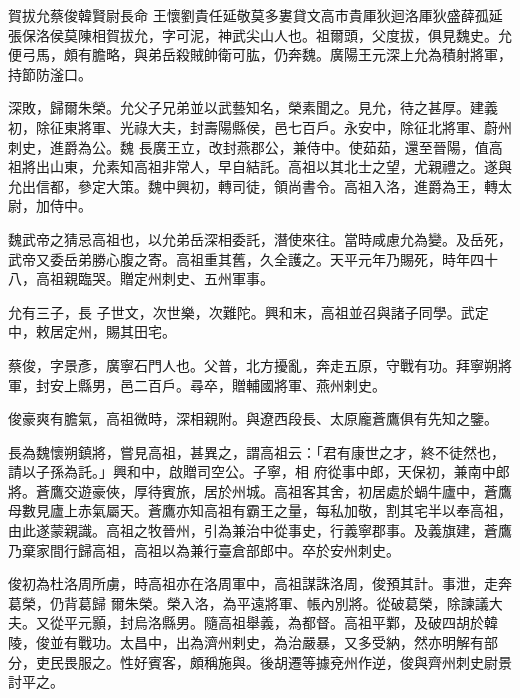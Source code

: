 
\begin{pinyinscope}

 賀拔允蔡俊韓賢尉長命
 王懷劉貴任延敬莫多婁貸文高市貴厙狄迴洛厙狄盛薛孤延
 張保洛侯莫陳相賀拔允，字可泥，神武尖山人也。祖爾頭，父度拔，俱見魏史。允便弓馬，頗有膽略，與弟岳殺賊帥衛可肱，仍奔魏。廣陽王元深上允為積射將軍，持節防滏口。



 深敗，歸爾朱榮。允父子兄弟並以武藝知名，榮素聞之。見允，待之甚厚。建義初，除征東將軍、光祿大夫，封壽陽縣侯，邑七百戶。永安中，除征北將軍、蔚州刺史，進爵為公。魏
 長廣王立，改封燕郡公，兼侍中。使茹茹，還至晉陽，值高祖將出山東，允素知高祖非常人，早自結託。高祖以其北士之望，尤親禮之。遂與允出信都，參定大策。魏中興初，轉司徒，領尚書令。高祖入洛，進爵為王，轉太尉，加侍中。



 魏武帝之猜忌高祖也，以允弟岳深相委託，潛使來往。當時咸慮允為變。及岳死，武帝又委岳弟勝心腹之寄。高祖重其舊，久全護之。天平元年乃賜死，時年四十八，高祖親臨哭。贈定州刺史、五州軍事。



 允有三子，長
 子世文，次世樂，次難陀。興和末，高祖並召與諸子同學。武定中，敕居定州，賜其田宅。



 蔡俊，字景彥，廣寧石門人也。父普，北方擾亂，奔走五原，守戰有功。拜寧朔將軍，封安上縣男，邑二百戶。尋卒，贈輔國將軍、燕州剌史。



 俊豪爽有膽氣，高祖微時，深相親附。與遼西段長、太原龐蒼鷹俱有先知之鑒。



 長為魏懷朔鎮將，嘗見高祖，甚異之，謂高祖云：「君有康世之才，終不徒然也，請以子孫為託。」興和中，啟贈司空公。子寧，相
 府從事中郎，天保初，兼南中郎將。蒼鷹交遊豪俠，厚待賓旅，居於州城。高祖客其舍，初居處於蝸牛廬中，蒼鷹母數見廬上赤氣屬天。蒼鷹亦知高祖有霸王之量，每私加敬，割其宅半以奉高祖，由此遂蒙親識。高祖之牧晉州，引為兼治中從事史，行義寧郡事。及義旗建，蒼鷹乃棄家間行歸高祖，高祖以為兼行臺倉部郎中。卒於安州刺史。



 俊初為杜洛周所虜，時高祖亦在洛周軍中，高祖謀誅洛周，俊預其計。事泄，走奔葛榮，仍背葛歸
 爾朱榮。榮入洛，為平遠將軍、帳內別將。從破葛榮，除諫議大夫。又從平元顥，封烏洛縣男。隨高祖舉義，為都督。高祖平鄴，及破四胡於韓陵，俊並有戰功。太昌中，出為濟州剌史，為治嚴暴，又多受納，然亦明解有部分，吏民畏服之。性好賓客，頗稱施與。後胡遷等據兗州作逆，俊與齊州刺史尉景討平之。




\end{pinyinscope}
